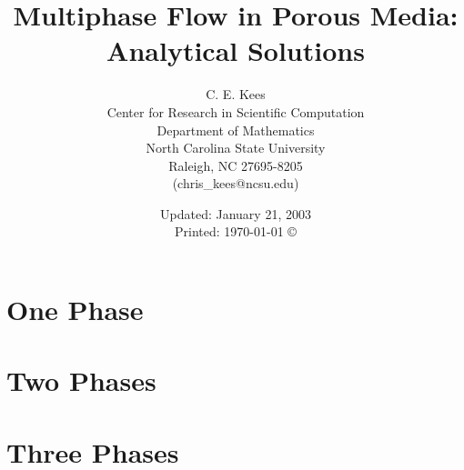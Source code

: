 \documentclass[12pt,dvips]{report}
\begin{document}

\begin{titlepage}
 \title{ Multiphase Flow in Porous Media: \\
Analytical Solutions}
 \author{ C. E. Kees \\
    Center for Research in Scientific Computation \\
    Department of Mathematics \\
    North Carolina State University \\
    Raleigh, NC 27695-8205 \\
    (chris\_kees@ncsu.edu) \\
    }

 \date{ Updated: January 21, 2003 \\
        Printed: \today 
        \vfill \copyright
      }
\end{titlepage}
\maketitle   

\tableofcontents {}

\chapter{One Phase}
\chapter{Two Phases}
\chapter{Three Phases}


\end{document}

